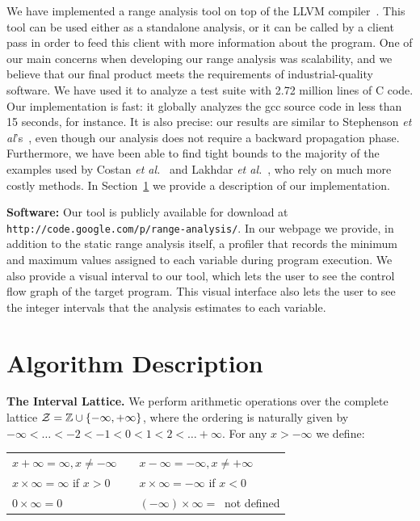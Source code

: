 \documentclass{paper}
\begin{document}
We have implemented a range analysis tool on top of the LLVM
compiler~\cite{Lattner04}.
This tool can be used either as a standalone analysis, or it can be called by a
client pass in order to feed this client with more information about the
program.
One of our main concerns when developing our range analysis was scalability,
and we believe that our final product meets the requirements of
industrial-quality software.
We have used it to analyze a test suite with 2.72 million lines of C code.
Our implementation is fast: it globally analyzes the gcc source code in less than
15 seconds, for instance. 
It is also precise: our results are similar to Stephenson
{\em et al}'s~\cite{Stephenson00}, even though our analysis does not require
a backward propagation phase.
Furthermore, we have been able to find tight bounds to the majority of the
examples used by Costan {\em et al.}~\cite{Costan05} and Lakhdar
{\em et al.}~\cite{Lakhdar11}, who rely on much more costly methods.
In Section~\ref{sec:dsc} we provide a description of our implementation.

\noindent
\textbf{Software: }
Our tool is publicly available for
download at \texttt{http://code.google.com/p/range-analysis/}.
In our webpage we provide, in addition to the static range analysis itself,
a profiler that records the minimum and maximum values assigned to each
variable during program execution.
We also provide a visual interval to our tool, which lets the user to
see the control flow graph of the target program.
This visual interface also lets the user to see the integer intervals that
the analysis estimates to each variable.


\section{Algorithm Description}
\label{sec:dsc}

\noindent
\textbf{The Interval Lattice.}
We perform arithmetic operations over the complete lattice
$\cal{Z} = \mathbb{Z} \cup \{-\infty, +\infty\}$, where the ordering is
naturally given by $-\infty < \ldots < -2 < -1 < 0 < 1 < 2 < \ldots +\infty$.
For any $x > -\infty$ we define:

\begin{tabular}{lcl}
$x + \infty = \infty, x \neq -\infty$ & \mbox{\hspace{0.1cm}} & $x - \infty = - \infty, x \neq +\infty$ \\
$x \times \infty = \infty$ if $x > 0$ & & $x \times \infty = -\infty$ if $x < 0$ \\
$0 \times \infty = 0$ & & $(-\infty) \times \infty = \ $ not defined  \\
\end{tabular}
\end{document}

